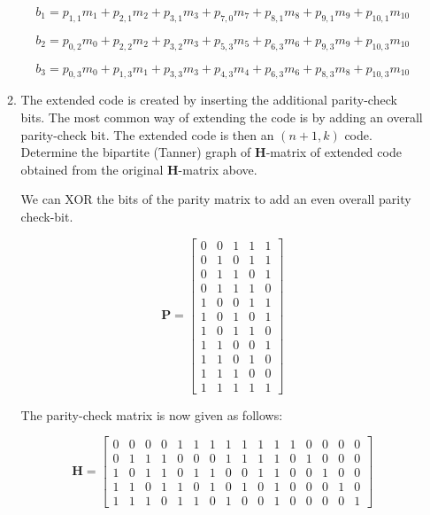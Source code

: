 \documentclass[fleqn]{article}
\begin{document}
\begin{enumerate}
\begin{enumerate}
			\begin{equation*}
				b_1 = p_{1,1}m_{1} + p_{2,1}m_{2} + p_{3,1}m_{3} + p_{7,0}m_{7} + p_{8,1}m_{8} + p_{9,1}m_{9} + p_{10,1}m_{10}
			\end{equation*}
			
			\begin{equation*}
				b_2 = p_{0,2}m_{0} + p_{2,2}m_{2} + p_{3,2}m_{3} + p_{5,3}m_{5} + p_{6,3}m_{6} + p_{9,3}m_{9} + p_{10,3}m_{10}
			\end{equation*}
			
			\begin{equation*}
				b_3 = p_{0,3}m_{0} + p_{1,3}m_{1} + p_{3,3}m_{3} + p_{4,3}m_{4} + p_{6,3}m_{6} + p_{8,3}m_{8} + p_{10,3}m_{10}
			\end{equation*}
			
			\item The extended code is created by inserting the additional parity-check bits. The most common way of extending the code is by adding an overall parity-check bit. The extended code is then an $(n+1,k)$ code. Determine the bipartite (Tanner) graph of $\mathbf{H}$-matrix of extended code obtained from the original $\mathbf{H}$-matrix above.
			
			We can XOR the bits of the parity matrix to add an even overall parity check-bit.
			
			\begin{equation*}
				\mathbf{P} = \begin{bmatrix}
					0 & 0 & 1 & 1 & 1 \\
					0 & 1 & 0 & 1 & 1 \\
					0 & 1 & 1 & 0 & 1 \\
					0 & 1 & 1 & 1 & 0 \\
					1 & 0 & 0 & 1 & 1 \\
					1 & 0 & 1 & 0 & 1 \\
					1 & 0 & 1 & 1 & 0 \\
					1 & 1 & 0 & 0 & 1 \\
					1 & 1 & 0 & 1 & 0 \\
					1 & 1 & 1 & 0 & 0 \\
					1 & 1 & 1 & 1 & 1
				\end{bmatrix}
			\end{equation*}
			
			The parity-check matrix is now given as follows:
			
			\begin{equation*}
				\mathbf{H} = \begin{bmatrix}
					0 & 0 & 0 & 0 & 1 & 1 & 1 & 1 & 1 & 1 & 1 & 1 & 0 & 0 & 0 & 0\\
					0 & 1 & 1 & 1 & 0 & 0 & 0 & 1 & 1 & 1 & 1 & 0 & 1 & 0 & 0 & 0\\
					1 & 0 & 1 & 1 & 0 & 1 & 1 & 0 & 0 & 1 & 1 & 0 & 0 & 1 & 0 & 0\\
					1 & 1 & 0 & 1 & 1 & 0 & 1 & 0 & 1 & 0 & 1 & 0 & 0 & 0 & 1 & 0\\
					1 & 1 & 1 & 0 & 1 & 1 & 0 & 1 & 0 & 0 & 1 & 0 & 0 & 0 & 0 & 1
				\end{bmatrix}
			\end{equation*}
				

\end{enumerate}
\end{enumerate}
\end{document}
